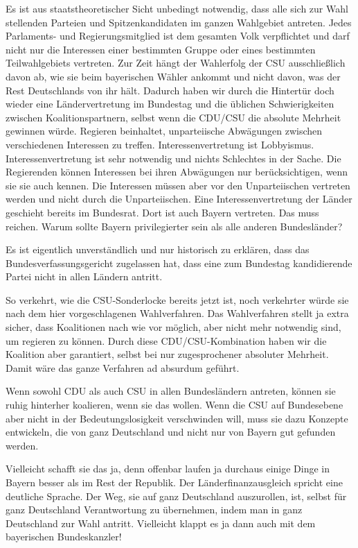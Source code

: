 Es ist aus staatstheoretischer Sicht unbedingt notwendig, dass alle sich zur Wahl stellenden
Parteien und Spitzenkandidaten im ganzen Wahlgebiet antreten. Jedes Parlaments- und
Regierungsmitglied ist dem gesamten Volk verpflichtet und darf nicht nur die Interessen einer
bestimmten Gruppe oder eines bestimmten Teilwahlgebiets vertreten. Zur Zeit hängt der Wahlerfolg
der CSU ausschließlich davon ab, wie sie beim bayerischen Wähler ankommt und nicht davon, was der
Rest Deutschlands von ihr hält. Dadurch haben wir durch die Hintertür doch wieder eine
Ländervertretung im Bundestag und die üblichen Schwierigkeiten zwischen Koalitionspartnern,
selbst wenn die CDU/CSU die absolute Mehrheit gewinnen würde. Regieren beinhaltet, unparteiische
Abwägungen zwischen verschiedenen Interessen zu treffen. Interessenvertretung ist Lobbyismus.
Interessenvertretung ist sehr notwendig und nichts Schlechtes in der Sache. Die Regierenden
können Interessen bei ihren Abwägungen nur berücksichtigen, wenn sie sie auch kennen. Die
Interessen müssen aber vor den Unparteiischen vertreten werden und nicht durch die Unparteiischen.
Eine Interessenvertretung der Länder geschieht bereits im Bundesrat. Dort ist auch Bayern
vertreten. Das muss reichen. Warum sollte Bayern privilegierter sein als alle anderen
Bundesländer?

Es ist eigentlich unverständlich und nur historisch zu erklären, dass das Bundesverfassungsgericht
zugelassen hat, dass eine zum Bundestag kandidierende Partei nicht in allen Ländern antritt.

So verkehrt, wie die CSU-Sonderlocke bereits jetzt ist, noch verkehrter würde sie nach dem hier
vorgeschlagenen Wahlverfahren. Das Wahlverfahren stellt ja extra sicher, dass Koalitionen nach
wie vor möglich, aber nicht mehr notwendig sind, um regieren zu können. Durch diese CDU/CSU-Kombination haben wir die Koalition aber garantiert, selbst bei nur zugesprochener absoluter
Mehrheit. Damit wäre das ganze Verfahren ad absurdum geführt.

Wenn sowohl CDU als auch CSU in
allen Bundesländern antreten, können sie ruhig hinterher koalieren, wenn sie das wollen. Wenn die
CSU auf Bundesebene aber nicht in der Bedeutungslosigkeit verschwinden will, muss sie dazu
Konzepte entwickeln, die von ganz Deutschland und nicht nur von Bayern gut gefunden werden.

Vielleicht schafft sie das ja, denn offenbar laufen ja durchaus einige Dinge in Bayern besser als
im Rest der Republik. Der Länderfinanzausgleich spricht eine deutliche Sprache. Der Weg, sie auf
ganz Deutschland auszurollen, ist, selbst für ganz Deutschland Verantwortung zu übernehmen, indem
man in ganz Deutschland zur Wahl antritt. Vielleicht klappt es ja dann auch mit dem bayerischen
Bundeskanzler!

